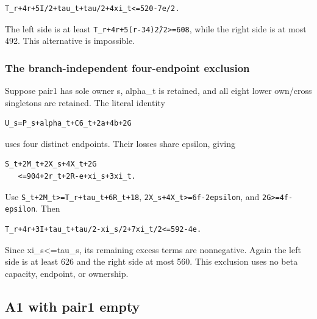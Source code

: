 \documentclass[10pt,a4paper]{article}
\theoremstyle{definition}
\begin{document}
\begin{lstlisting}
T_r+4r+5I/2+tau_t+tau/2+4xi_t<=520-7e/2.
\end{lstlisting}

The left side is at least
\texttt{T\_\allowbreak{}\allowbreak{}r+\allowbreak{}4r+\allowbreak{}5(r-34)\^2/\allowbreak{}2>=\allowbreak{}608},\allowbreak{} while the right
side is at most 492. This alternative is impossible.

\hypertarget{the-branch-independent-four-endpoint-exclusion}{%
\subsubsection{The branch-independent four-endpoint
exclusion}\label{the-branch-independent-four-endpoint-exclusion}}

Suppose pair1 has sole owner s,\allowbreak{} alpha\_\allowbreak{}t is retained,\allowbreak{} and all eight
lower own/cross singletons are retained. The literal identity

\begin{lstlisting}
U_s=P_s+alpha_t+C6_t+2a+4b+2G
\end{lstlisting}

uses four distinct endpoints. Their losses share epsilon,\allowbreak{} giving

\begin{lstlisting}
S_t+2M_t+2X_s+4X_t+2G
   <=904+2r_t+2R-e+xi_s+3xi_t.
\end{lstlisting}

Use \texttt{S\_\allowbreak{}\allowbreak{}t+\allowbreak{}2M\_\allowbreak{}\allowbreak{}t>=\allowbreak{}T\_\allowbreak{}\allowbreak{}r+\allowbreak{}tau\_\allowbreak{}\allowbreak{}t+\allowbreak{}6R\_\allowbreak{}\allowbreak{}t+\allowbreak{}18},\allowbreak{}
\texttt{2X\_\allowbreak{}\allowbreak{}s+\allowbreak{}4X\_\allowbreak{}\allowbreak{}t>=\allowbreak{}6f-2epsilon},\allowbreak{} and
\texttt{2G>=\allowbreak{}4f-epsilon}. Then

\begin{lstlisting}
T_r+4r+3I+tau_t+tau/2-xi_s/2+7xi_t/2<=592-4e.
\end{lstlisting}

Since xi\_\allowbreak{}s\textless=\allowbreak{}tau\_\allowbreak{}s,\allowbreak{} its remaining excess terms are nonnegative.
Again the left side is at least 626 and the right side at most 560. This
exclusion uses no beta capacity,\allowbreak{} endpoint,\allowbreak{} or ownership.

\hypertarget{a1-with-pair1-empty}{%
\subsection{A1 with pair1 empty}\label{a1-with-pair1-empty}}
\end{document}
